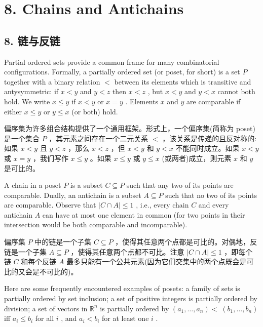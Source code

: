 \documentclass[10pt]{article}
\begin{document}
\section*{8. Chains and Antichains}

\begin{tcolorbox}\relax
\section*{8. 链与反链}
\end{tcolorbox}

Partial ordered sets provide a common frame for many combinatorial configurations. Formally, a partially ordered set (or poset, for short) is a set \(P\) together with a binary relation \(<\) between its elements which is transitive and antysymmetric: if \(x < y\) and \(y < z\) then \(x < z\) , but \(x < y\) and \(y < x\) cannot both hold. We write \(x \leq  y\) if \(x < y\) or \(x = y\) . Elements \(x\) and \(y\) are comparable if either \(x \leq  y\) or \(y \leq  x\) (or both) hold.

\begin{tcolorbox}\relax
偏序集为许多组合结构提供了一个通用框架。形式上，一个偏序集(简称为 poset)是一个集合 \(P\) ，其元素之间存在一个二元关系 \(<\) ，该关系是传递的且反对称的:如果 \(x < y\) 且 \(y < z\) ，那么 \(x < z\) ，但 \(x < y\) 和 \(y < x\) 不能同时成立。如果 \(x < y\) 或 \(x = y\) ，我们写作 \(x \leq  y\) 。如果 \(x \leq  y\) 或 \(y \leq  x\) (或两者)成立，则元素 \(x\) 和 \(y\) 是可比的。
\end{tcolorbox}

A chain in a poset \(P\) is a subset \(C \subseteq  P\) such that any two of its points are comparable. Dually, an antichain is a subset \(A \subseteq  P\) such that no two of its points are comparable. Observe that \(\left| {C \cap  A}\right|  \leq  1\) , i.e., every chain \(C\) and every antichain \(A\) can have at most one element in common (for two points in their intersection would be both comparable and incomparable).

\begin{tcolorbox}\relax
偏序集 \(P\) 中的链是一个子集 \(C \subseteq  P\) ，使得其任意两个点都是可比的。对偶地，反链是一个子集 \(A \subseteq  P\) ，使得其任意两个点都不可比。注意 \(\left| {C \cap  A}\right|  \leq  1\) ，即每个链 \(C\) 和每个反链 \(A\) 最多只能有一个公共元素(因为它们交集中的两个点既会是可比的又会是不可比的)。
\end{tcolorbox}

Here are some frequently encountered examples of posets: a family of sets is partially ordered by set inclusion; a set of positive integers is partially ordered by division; a set of vectors in \({\mathbb{R}}^{n}\) is partially ordered by \(\left( {{a}_{1},\ldots ,{a}_{n}}\right)  < \; \left( {{b}_{1},\ldots ,{b}_{n}}\right)\) iff \({a}_{i} \leq  {b}_{i}\) for all \(i\) , and \({a}_{i} < {b}_{i}\) for at least one \(i\) .
\end{document}
